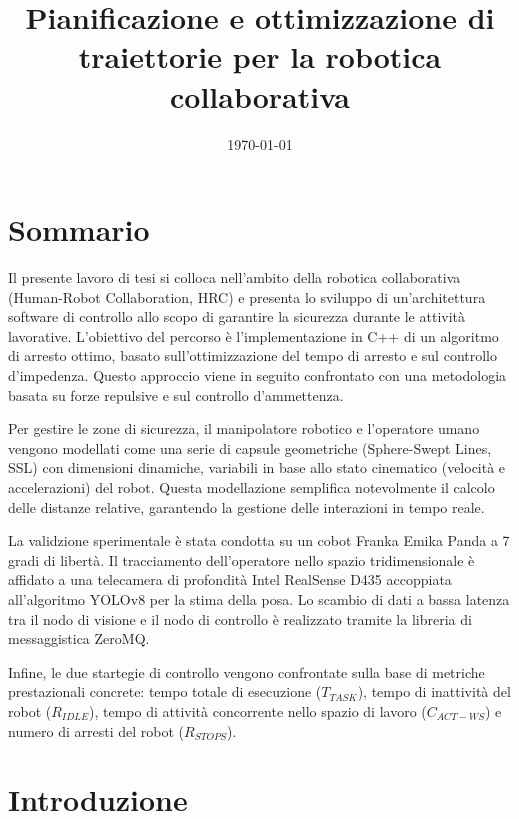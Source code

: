 \documentclass[12pt,a4paper, twoside, openright]{report}
\title{Pianificazione e ottimizzazione di traiettorie per la robotica collaborativa}
\date{\today}
\begin{document}
\maketitle


\chapter*{Sommario}

Il presente lavoro di tesi si colloca nell'ambito della  robotica collaborativa (Human-Robot Collaboration, HRC) e presenta lo sviluppo di un'architettura software di controllo allo scopo di garantire la sicurezza durante le attività lavorative. L'obiettivo del percorso è l'implementazione in C++ di un algoritmo di arresto ottimo, basato sull'ottimizzazione del tempo di arresto e sul controllo d'impedenza. Questo approccio viene in seguito confrontato con una metodologia basata su forze repulsive e sul controllo d'ammettenza.

Per gestire le zone di sicurezza, il manipolatore robotico e l'operatore umano vengono modellati come una serie di capsule geometriche (Sphere-Swept Lines, SSL) con dimensioni dinamiche, variabili in base allo stato cinematico (velocità e accelerazioni) del robot. Questa modellazione semplifica notevolmente il calcolo delle distanze relative, garantendo la gestione delle interazioni in tempo reale.

La validzione sperimentale è stata condotta su un cobot Franka Emika Panda a 7 gradi di libertà. Il tracciamento dell'operatore nello spazio tridimensionale è affidato a una telecamera di profondità Intel RealSense D435 accoppiata all'algoritmo YOLOv8 per la stima della posa. Lo scambio di dati a bassa latenza tra il nodo di visione e il nodo di controllo è realizzato tramite la libreria di messaggistica ZeroMQ.

Infine, le due startegie di controllo vengono confrontate sulla base di metriche prestazionali concrete: tempo totale di esecuzione ($T_{TASK}$), tempo di inattività del robot ($R_{IDLE}$), tempo di attività concorrente nello spazio di lavoro ($C_{ACT-WS}$) e numero di arresti del robot ($R_{STOPS}$).
 
\tableofcontents

\listoffigures

\clearpage
{}

\chapter{Introduzione}

\end{document}
